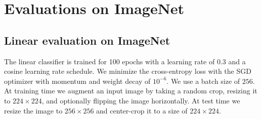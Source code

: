 








\section{Evaluations on ImageNet}

\subsection{Linear evaluation on ImageNet}
\label{sec:linear_evaluation}
The linear classifier is trained for 100 epochs with a learning rate of $0.3$ and a cosine learning rate schedule. We minimize the cross-entropy loss with the SGD optimizer with momentum and weight decay of $10^{-6}$. We use a batch size of $256$. At training time we augment an input image by taking a random crop, resizing it to $224 \times 224$, and optionally flipping the image horizontally. At test time we resize the image to $256 \times 256$ and center-crop it to a size of $224 \times 224$.

